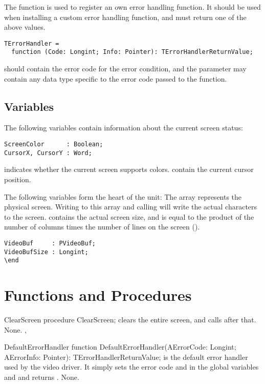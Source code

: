 The  function is used to register an own error
handling function. It should be used when installing a custom error
handling function, and must return one of the above values.
\begin{verbatim}
TErrorHandler = 
  function (Code: Longint; Info: Pointer): TErrorHandlerReturnValue;
\end{verbatim}
 should contain the error code for the error condition, 
and the  parameter may contain any data type specific to 
the error code passed to the function.

\subsection{Variables}
The following variables contain information about the current screen
status:
\begin{verbatim}
ScreenColor      : Boolean;
CursorX, CursorY : Word;
\end{verbatim}
 indicates whether the current screen supports colors.
 contain the current cursor position.

The following variables form the heart of the  unit: The
 array represents the physical screen. Writing to this
array and calling  will write the actual characters
to the screen.  contains the actual screen size, and is
equal to the product of the number of columns times the number of lines 
on the screen ().
\begin{verbatim}
VideoBuf     : PVideoBuf;
VideoBufSize : Longint;
\end
\end{verbatim}

\section{Functions and Procedures}

\begin{procedure}{ClearScreen}
\Declaration
procedure ClearScreen; 
\Description
{} clears the entire screen, and calls 
after that.
\Errors
None.
\SeeAlso
{}, 
\end{procedure}

\begin{procedure}{DefaultErrorHandler}
\Declaration
function  DefaultErrorHandler(AErrorCode: Longint; AErrorInfo: Pointer): TErrorHandlerReturnValue; 
\Description
{} is the default error handler used by the video
driver. It simply sets the error code  and  
in the global variables  and  and returns 
.
\Errors
None.
\SeeAlso
\end{procedure}

